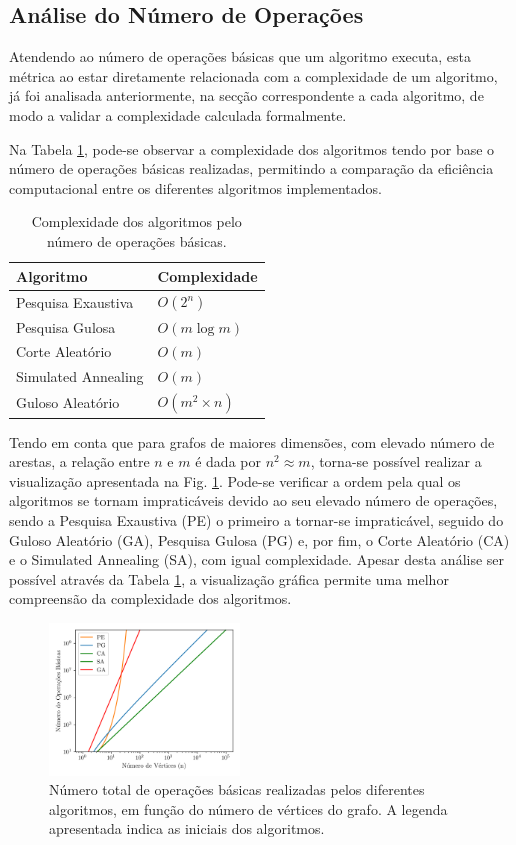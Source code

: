 \documentclass[mirror, portugues]{revdetua}
\begin{document}
\subsection{Análise do Número de Operações}

Atendendo ao número de operações básicas que um algoritmo executa, esta métrica ao estar diretamente relacionada com a complexidade de um algoritmo, já foi analisada anteriormente, na secção correspondente a cada algoritmo, de modo a validar a complexidade calculada formalmente.

Na Tabela \ref{table:numops}, pode-se observar a complexidade dos algoritmos tendo por base o número de operações básicas realizadas, permitindo a comparação da eficiência computacional entre os diferentes algoritmos implementados.

\begin{table}[H]
\centering
\caption{Complexidade dos algoritmos pelo número de operações básicas.}
\label{table:numops}
\begin{tabular}{ll}
\toprule
\textbf{Algoritmo} & \textbf{Complexidade} \\
\midrule
Pesquisa Exaustiva & $O(2^n)$ \\
Pesquisa Gulosa & $O(m \log m)$ \\
Corte Aleatório & $O(m)$ \\
Simulated Annealing & $O(m)$ \\
Guloso Aleatório & $O(m^2 \times n)$ \\
\bottomrule
\end{tabular}
\end{table}

Tendo em conta que para grafos de maiores dimensões, com elevado número de arestas, a relação entre $n$ e $m$ é dada por $n^2 \approx m$, torna-se possível realizar a visualização apresentada na Fig. \ref{fig:total_ops_per_alg}. Pode-se verificar a ordem pela qual os algoritmos se tornam impraticáveis devido ao seu elevado número de operações, sendo a Pesquisa Exaustiva (PE) o primeiro a tornar-se impraticável, seguido do Guloso Aleatório (GA), Pesquisa Gulosa (PG) e, por fim, o Corte Aleatório (CA) e o Simulated Annealing (SA), com igual complexidade. Apesar desta análise ser possível através da Tabela \ref{table:numops}, a visualização gráfica permite uma melhor compreensão da complexidade dos algoritmos.

\begin{figure}[H]
    \centering
    \includegraphics[width=0.45\textwidth]{../assets/basicops.png}
    \caption{Número total de operações básicas realizadas pelos diferentes algoritmos, em função do número de vértices do grafo. A legenda apresentada indica as iniciais dos algoritmos.}
    \label{fig:total_ops_per_alg}
\end{figure}
\end{document}

